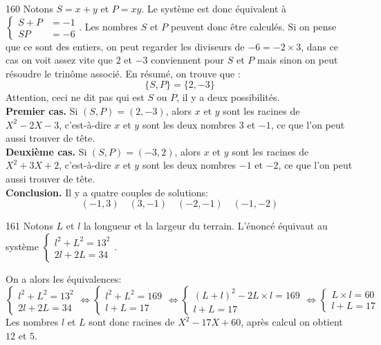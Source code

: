\begin{Soln}{160}
Notons $S=x+y$ et $P=xy$. Le système est donc équivalent à $
\begin{cases}
S+P &=-1\\
SP &=-6
\end{cases}
$.
Les nombres $S$ et $P$ peuvent donc être calculés. Si on pense que ce sont des entiers, on peut regarder les diviseurs de $-6=-2\times3$, dans ce cas on voit assez vite que $2$ et $-3$ conviennent pour $S$ et $P$ mais sinon on peut résoudre le trinôme associé. En résumé, on trouve que :
\[\{S,P\}=\{2,-3\}\]
Attention, ceci ne dit pas qui est $S$ ou $P$, il y a deux possibilités.\\

\noindent\textbf{Premier cas.} Si $(S,P)=(2,-3)$, alors $x$ et $y$ sont les racines de $X^2-2X-3$, c'est-à-dire $x$ et $y$ sont les deux nombres $3$ et $-1$, ce que l'on peut aussi trouver de tête.\\

\noindent\textbf{Deuxième cas.} Si $(S,P)=(-3,2)$, alors $x$ et $y$ sont les racines de $X^2+3X+2$, c'est-à-dire $x$ et $y$ sont les deux nombres $-1$ et $-2$, ce que l'on peut aussi trouver de tête.\\

\noindent\textbf{Conclusion.} Il y a quatre couples de solutions:
\[ (-1,3)\quad (3,-1) \quad (-2,-1) \quad (-1,-2)\]
\end{Soln}
\begin{Soln}{161}
Notons $L$ et $l$ la longueur et la largeur du terrain. L'énoncé équivaut au système $\begin{cases}
l^2+L^2 = 13^2\\
2l+2L = 34
\end{cases}$.

On a alors les équivalences:
\[
\begin{cases}
l^2+L^2 = 13^2\\
2l+2L = 34
\end{cases}
\iff
\begin{cases}
l^2+L^2 = 169\\
l+L = 17
\end{cases}
\iff
\begin{cases}
(L+l)^2-2L\times l = 169\\
l+L = 17
\end{cases}
\iff
\begin{cases}
L\times l = 60\\
l+L = 17
\end{cases}
\]
Les nombres $l$ et $L$ sont donc racines de $X^2-17X+60$, après calcul on obtient $12$ et $5$.
\end{Soln}
